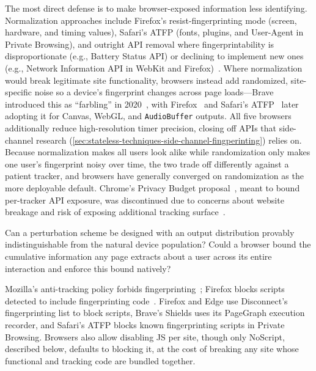 %
The most direct defense is to make browser-exposed information less identifying.
%
Normalization approaches include Firefox's resist-fingerprinting mode (screen, hardware, and timing values), Safari's ATFP (fonts, plugins, and User-Agent in Private Browsing), and outright API removal where fingerprintability is disproportionate (e.g., Battery Status API) or declining to implement new ones (e.g., Network Information API in WebKit and Firefox)~\cite{TrackingPreventionWebKit2020}.
%
Where normalization would break legitimate site functionality, browsers instead add randomized, site-specific noise so a device's fingerprint changes across page loads---Brave introduced this as ``farbling'' in 2020~\cite{braveprivacyteamFingerprintingDefenses202020}, with Firefox~\cite{huang1816056FprandomizationMeta2023} and Safari's ATFP~\cite{wilanderPrivateBrowsing202024} later adopting it for Canvas, WebGL, and \texttt{AudioBuffer} outputs.
%
All five browsers additionally reduce high-resolution timer precision, closing off APIs that side-channel research (\autoref{sec:stateless-techniques-side-channel-fingperinting}) relies on.
%
Because normalization makes all users look alike while randomization only makes one user's fingerprint noisy over time, the two trade off differently against a patient tracker, and browsers have generally converged on randomization as the more deployable default.
%
Chrome's Privacy Budget proposal~\cite{lasseyMikewestPrivacybudget2019}, meant to bound per-tracker API exposure, was discontinued due to concerns about website breakage and risk of exposing additional tracking surface~\cite{snyderBraveFingerprintingPrivacy2019,rescorlaTechnicalCommentsPrivacy2021,leflerWhatHappenedPrivacy2024}.


\begin{opbox}
Can a perturbation scheme be designed with an output distribution provably indistinguishable from the natural device population?
%
%
Could a browser bound the cumulative information any page extracts about a user across its entire interaction and enforce this bound natively?
\end{opbox}


%
Mozilla's anti-tracking policy forbids fingerprinting~\cite{mozillaSecurityTrackingPolicy2019}; Firefox blocks scripts detected to include fingerprinting code~\cite{englehardtFirefox72Blocks2020}.
%
Firefox and Edge use Disconnect's fingerprinting list to block scripts, Brave's Shields uses its PageGraph execution recorder, and Safari's ATFP blocks known fingerprinting scripts in Private Browsing.
%
Browsers also allow disabling JS per site, though only NoScript, described below, defaults to blocking it, at the cost of breaking any site whose functional and tracking code are bundled together.



